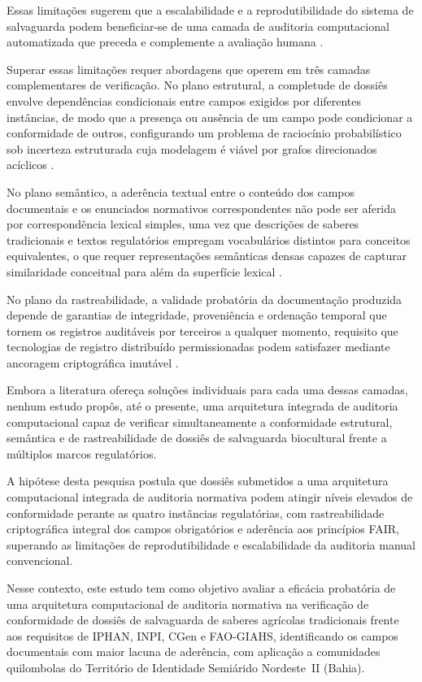 Essas limitações sugerem que a escalabilidade e a reprodutibilidade do sistema de salvaguarda podem beneficiar-se de uma camada de auditoria computacional automatizada que preceda e complemente a avaliação humana \cite{Hashmi2018}.

Superar essas limitações requer abordagens que operem em três camadas complementares de verificação. No plano estrutural, a completude de dossiês envolve dependências condicionais entre campos exigidos por diferentes instâncias, de modo que a presença ou ausência de um campo pode condicionar a conformidade de outros, configurando um problema de raciocínio probabilístico sob incerteza estruturada cuja modelagem é viável por grafos direcionados acíclicos \cite{Pearl2009,Koller2009}.

No plano semântico, a aderência textual entre o conteúdo dos campos documentais e os enunciados normativos correspondentes não pode ser aferida por correspondência lexical simples, uma vez que descrições de saberes tradicionais e textos regulatórios empregam vocabulários distintos para conceitos equivalentes, o que requer representações semânticas densas capazes de capturar similaridade conceitual para além da superfície lexical \cite{Reimers2019,Devlin2019}.

No plano da rastreabilidade, a validade probatória da documentação produzida depende de garantias de integridade, proveniência e ordenação temporal que tornem os registros auditáveis por terceiros a qualquer momento, requisito que tecnologias de registro distribuído permissionadas podem satisfazer mediante ancoragem criptográfica imutável \cite{Hyperledger2020,Wilkinson2016}.

Embora a literatura ofereça soluções individuais para cada uma dessas camadas, nenhum estudo propôs, até o presente, uma arquitetura integrada de auditoria computacional capaz de verificar simultaneamente a conformidade estrutural, semântica e de rastreabilidade de dossiês de salvaguarda biocultural frente a múltiplos marcos regulatórios.

A hipótese desta pesquisa postula que dossiês submetidos a uma arquitetura computacional integrada de auditoria normativa podem atingir níveis elevados de conformidade perante as quatro instâncias regulatórias, com rastreabilidade criptográfica integral dos campos obrigatórios e aderência aos princípios FAIR, superando as limitações de reprodutibilidade e escalabilidade da auditoria manual convencional.

Nesse contexto, este estudo tem como objetivo avaliar a eficácia probatória de uma arquitetura computacional de auditoria normativa na verificação de conformidade de dossiês de salvaguarda de saberes agrícolas tradicionais frente aos requisitos de IPHAN, INPI, CGen e FAO-GIAHS, identificando os campos documentais com maior lacuna de aderência, com aplicação a comunidades quilombolas do Território de Identidade Semiárido Nordeste~II (Bahia).


